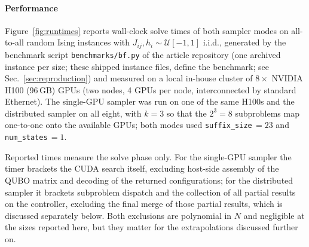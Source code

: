 \documentclass[12pt,a4paper]{elsarticle}
\begin{document}
\paragraph{Performance}
Figure~\ref{fig:runtimes} reports wall-clock solve times of both sampler modes on
all-to-all random Ising instances with $J_{ij},h_i\sim \mathcal{U}[-1,1]$ i.i.d.,
generated by the benchmark script \texttt{benchmarks/bf.py} of the article repository
(one archived instance per size; these shipped instance files,
define the benchmark; see Sec.~\ref{sec:reproduction}) and measured on a local
in-house cluster of $8\times$ NVIDIA H100 (96\,GB) GPUs (two nodes, 4 GPUs per
node, interconnected by standard Ethernet). The single-GPU sampler was run on one
of the same H100s and the distributed sampler on all eight, with $k=3$ so that
the $2^{3}=8$ subproblems map one-to-one onto the available GPUs; both modes used
\texttt{suffix\_size}\,$=23$ and \texttt{num\_states}\,$=1$.

Reported times measure the solve phase only. For the single-GPU sampler the timer
brackets the CUDA search itself, excluding host-side assembly of the QUBO matrix
and decoding of the returned configurations; for the distributed sampler it
brackets subproblem dispatch and the collection of all partial results on the
controller, excluding the final merge of those partial results, which is
discussed separately below. Both exclusions are polynomial in $N$ and negligible
at the sizes reported here, but they matter for the extrapolations discussed
further on.
\end{document}
